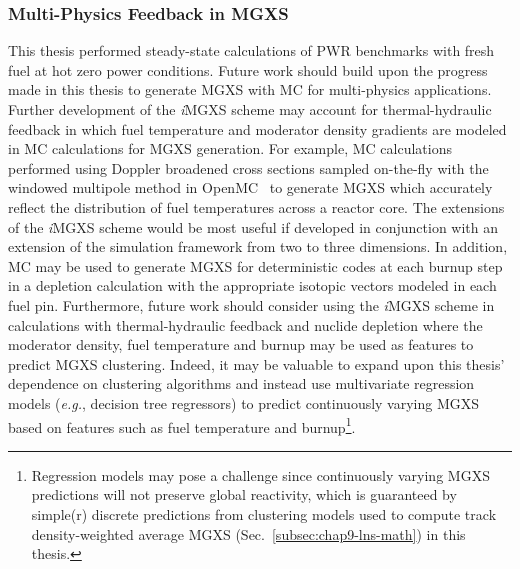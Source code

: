 


\subsubsection{Multi-Physics Feedback in MGXS}
\label{subsubsec:chap12-multi-physics-mgxs}

This thesis performed steady-state calculations of \ac{PWR} benchmarks with fresh fuel at hot zero power conditions. Future work should build upon the progress made in this thesis to generate \ac{MGXS} with \ac{MC} for multi-physics applications. Further development of the \textit{i}\ac{MGXS} scheme may account for thermal-hydraulic feedback in which fuel temperature and moderator density gradients are modeled in \ac{MC} calculations for \ac{MGXS} generation. For example, \ac{MC} calculations performed using Doppler broadened cross sections sampled on-the-fly with the windowed multipole method in OpenMC~\cite{forget2014direct} to generate \ac{MGXS} which accurately reflect the distribution of fuel temperatures across a reactor core. The extensions of the \textit{i}\ac{MGXS} scheme would be most useful if developed in conjunction with an extension of the simulation framework from two to three dimensions. In addition, \ac{MC} may be used to generate \ac{MGXS} for deterministic codes at each burnup step in a depletion calculation with the appropriate isotopic vectors modeled in each fuel pin. Furthermore, future work should consider using the \textit{i}\ac{MGXS} scheme in calculations with thermal-hydraulic feedback and nuclide depletion where the moderator density, fuel temperature and burnup may be used as features to predict MGXS clustering. Indeed, it may be valuable to expand upon this thesis' dependence on clustering algorithms and instead use multivariate regression models (\textit{e.g.}, decision tree regressors) to predict continuously varying \ac{MGXS} based on features such as fuel temperature and burnup\footnote{Regression models may pose a challenge since continuously varying \ac{MGXS} predictions will not preserve global reactivity, which is guaranteed by simple(r) discrete predictions from clustering models used to compute track density-weighted average \ac{MGXS} (Sec.~\ref{subsec:chap9-lns-math}) in this thesis.}.

